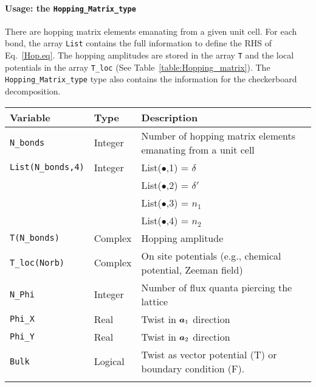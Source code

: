 \paragraph*{Usage: the \texttt{Hopping\_Matrix\_type} }
\label{Hopping_Matrix_type.sec} 


There are     hopping   matrix  elements  emanating  from  a  given unit  cell. For  each bond,  the array 
\texttt{List}   contains the full  information to define the  RHS of Eq.~\eqref{Hop.eq}.    The hopping amplitudes are  stored in the  array  \texttt{T}  and the local potentials in the  array \texttt{T\_loc}   (See  Table~\ref{table:Hopping_matrix}).    The  \texttt{Hopping\_Matrix\_type}   type    also contains the information for the  checkerboard   decomposition.

\begin{table}[h]
	\begin{center}
		\begin{tabular}{@{} p{} @{} p{} p{} @{}}\toprule
			Variable & Type & Description \\\midrule
			\texttt{N\_bonds}  &  Integer  &      Number of  hopping  matrix elements emanating from a unit cell   \\
			\texttt{List(N\_bonds,4)}    & Integer &  List($\bullet$,1) =   $\delta$ \\
			&              &  List($\bullet$,2) =   $\delta'$ \\
			&              &  List($\bullet$,3) =   $n_1$     \\
			&              &  List($\bullet$,4) =   $n_2$     \\ 
			\texttt{T(N\_bonds)}          & Complex &   Hopping amplitude   \\
			\texttt{T\_loc(Norb)}           & Complex &    On site  potentials (e.g., chemical potential, Zeeman field)   \\
			\texttt{N\_Phi}                    & Integer     &  Number of  flux quanta piercing the lattice   \\
			\texttt{Phi\_X}                    &  Real        &   Twist in $\boldsymbol{a}_1$  direction   \\
			\texttt{Phi\_Y}                    &  Real        &   Twist in $\boldsymbol{a}_2$  direction   \\
			\texttt{Bulk}                        &   Logical   &   Twist as vector potential (T) or  boundary condition (F).
			\\  \\

\end{tabular}
\end{center}
\end{table}
